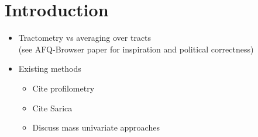 \section{Introduction}

\begin{itemize}
  \item Tractometry vs averaging over tracts \\
    (see AFQ-Browser paper for inspiration and political correctness)
  \item Existing methods
    \begin{itemize}
      \item Cite profilometry\cite{dayan2016profilometry}
      \item Cite Sarica\cite{sarica2017corticospinal}
      \item Discuss mass univariate approaches\cite{yeatman2014lifespan}
    \end{itemize}
\end{itemize}

